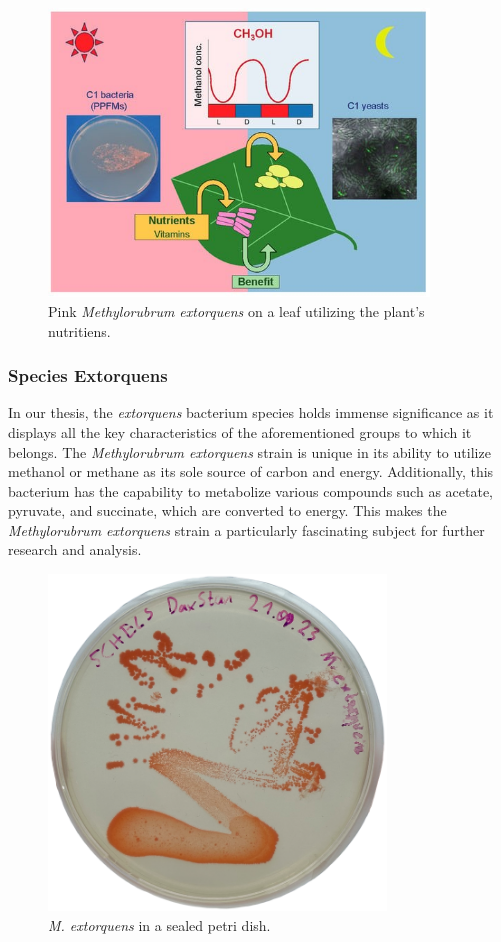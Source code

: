 \begin{figure}[H]
    \centering
    \includegraphics[width=0.9\textwidth]{./media/images/mextorquens_on_leaf}
    \caption{Pink \emph{Methylorubrum extorquens} on a leaf utilizing the plant's nutritiens.}
    \label{fig:mextorquens_on_leaf}
\end{figure}

\subsubsection{Species Extorquens}
In our thesis, the \emph{extorquens} bacterium species holds immense significance as it displays all the key characteristics of the aforementioned groups to which it belongs.
The \emph{Methylorubrum extorquens} strain is unique in its ability to utilize methanol or methane as its sole source of carbon and energy.
Additionally, this bacterium has the capability to metabolize various compounds such as acetate, pyruvate, and succinate, which are converted to energy.
This makes the \emph{Methylorubrum extorquens} strain a particularly fascinating subject for further research and analysis.

\begin{figure}[H]
    \centering
    \includegraphics[width=0.8\textwidth]{./media/images/mextorquens_sealed}
    \caption{\emph{M. extorquens} in a sealed petri dish.}
    \label{fig:mextorquens_petri_sealed}
\end{figure}


